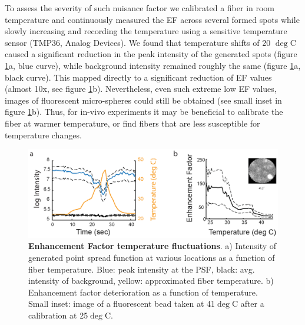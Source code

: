 \documentclass[10pt]{article}
\begin{document}
To assess the severity of such nuisance factor we calibrated a fiber in room temperature and continuously measured the EF across several formed spots while slowly increasing and recording the temperature using a sensitive temperature sensor (TMP36, Analog Devices). 
We found that temperature shifts of 20 $\deg$C caused a significant reduction in the peak intensity of the generated spots (figure \ref{fig:figure8}a, blue curve), while background intensity remained roughly the same (figure \ref{fig:figure8}a, black curve). This mapped directly to a significant reduction of EF values (almost 10x, see figure \ref{fig:figure8}b). Nevertheless, even such extreme low EF values, images of fluorescent micro-spheres could still be obtained (see small inset in figure \ref{fig:figure8}b). Thus, for in-vivo experiments it may be beneficial to calibrate the fiber at warmer temperature, or find fibers that are less susceptible for temperature changes. 

\begin{figure}
\centering\includegraphics[width=12cm]{figure8}
\caption{\textbf{Enhancement Factor temperature fluctuations}. a) Intensity of generated point spread function at various locations as a function of fiber temperature.  Blue: peak intensity at the PSF, black: avg. intensity of background, yellow: approximated fiber temperature. b) Enhancement factor deterioration as a function of temperature. Small inset: image of a fluorescent bead taken at 41$\deg$C after a calibration at 25$\deg$C.}
\label{fig:figure8}
\end{figure}
\end{document}

